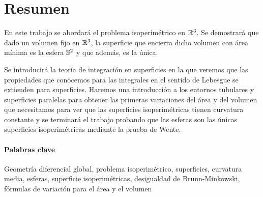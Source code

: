 \section{Resumen}

En este trabajo se abordará el problema isoperimétrico en $\mathbb{R}^3$. Se demostrará que dado un volumen fijo en $\mathbb{R}^3$, la superficie que encierra dicho volumen con área mínima es la esfera $\mathbb{S}^2$ y que además, es la única. 

Se introducirá la teoría de integración en superficies en la que veremos que las propiedades que conocemos para las integrales en el sentido de Lebesgue se extienden para superficies. Haremos una introducción a los entornos tubulares y superficies paralelas para obtener las primeras variaciones del área y del volumen que necesitamos para ver que las superficies isoperimétricas tienen curvatura constante y se terminará el trabajo probando que las esferas son las únicas superficies isoperimétricas mediante la prueba de Wente.

\paragraph{Palabras clave} Geometría diferencial global, problema isoperimétrico, superficies, curvatura media, esferas, superficie isoperimétricas, desigualdad de Brunn-Minkowski, fórmulas de variación para el área y el volumen

\newpage
